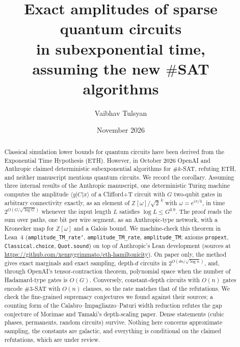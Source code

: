 \documentclass[10pt]{amsart}
\theoremstyle{plain}
\theoremstyle{definition}
\theoremstyle{remark}
\numberwithin{equation}{section}
\newcommand{\Z}{\mathbb{Z}}
\newcommand{\Zw}{\Z[\omega]}
\newcommand{\amp}[3]{\langle #1|#2|#3\rangle}
\begin{document}
\title[Exact quantum circuit amplitudes after the ETH refutations]{Exact amplitudes of sparse quantum circuits\\ in subexponential time,\\ assuming the new $\#$SAT algorithms}

\author{Vaibhav Tulsyan}

\date{November 2026}


\begin{abstract}
Classical simulation lower bounds for quantum circuits have been derived from the Exponential Time
Hypothesis (ETH). However, in October 2026 OpenAI and Anthropic claimed deterministic subexponential
algorithms for $\#k$-SAT, refuting ETH, and neither manuscript mentions quantum circuits. We record the
corollary. Assuming three internal results of the Anthropic manuscript, one deterministic Turing
machine computes the amplitude $\amp{y}{C}{x}$ of a Clifford+T circuit with $G$ two-qubit gates in
arbitrary connectivity exactly, as an element of $\Zw/\sqrt2^{\,k}$ with $\omega=e^{i\pi/4}$, in time
$2^{O(G/\sqrt{\log G})}$ whenever the input length $L$ satisfies $\log L\le G^{0.9}$. The proof reads
the sum over paths, one bit per wire segment, as an Anthropic-type network, with a Kronecker map for
$\Zw$ and a Galois bound. We machine-check this theorem in Lean~4 (\texttt{amplitude\_TM\_rate'},
\texttt{amplitude\_TM\_rate}, \texttt{amplitude\_TM}; axioms \texttt{propext},
\texttt{Classical.choice}, \texttt{Quot.sound}) on top of Anthropic's Lean development (sources at
\url{https://github.com/xennygrimmato/eth-hamiltonicity}). On paper only, the method gives exact
marginals and exact sampling, depth-$d$ circuits in $2^{O(dn/\sqrt{\log n})}$, and, through OpenAI's
tensor-contraction theorem, polynomial space when the number of Hadamard-type gates is $O(G)$.
Conversely, constant-depth circuits with $O(n)$ gates encode $\#3$-SAT with $O(n)$ clauses, so the
rate matches that of the refutations. We check the fine-grained supremacy conjectures we
found against their sources; a counting form of the Calabro--Impagliazzo--Paturi width reduction refutes the
gap conjecture of Morimae and Tamaki's depth-scaling paper. Dense statements (cubic phases,
permanents, random circuits) survive. Nothing here concerns approximate sampling, the constants are
galactic, and everything is conditional on the claimed refutations, which are under review.
\end{abstract}
\end{document}

